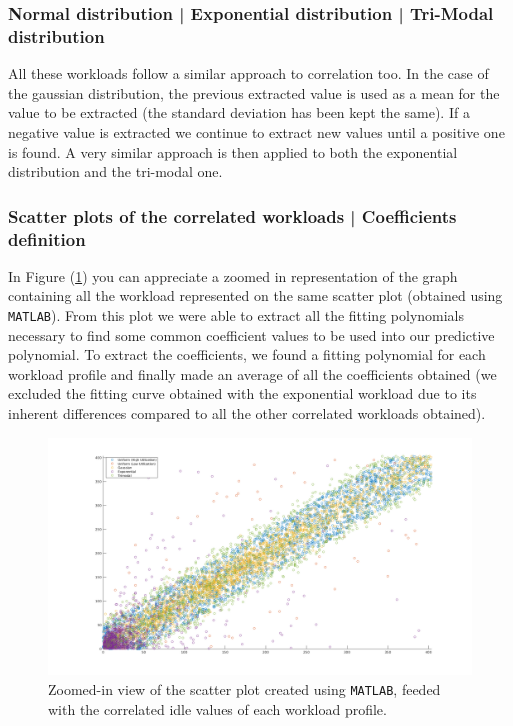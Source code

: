 \documentclass[a4paper]{article}
\begin{document}
        \subsubsection{Normal distribution | Exponential distribution | Tri-Modal distribution}
            All these workloads follow a similar approach to correlation too.
            In the case of the gaussian distribution, the previous extracted value is used as a mean for the value to be extracted (the standard deviation has been kept the same). If a negative value is extracted we continue to extract new values until a positive one is found.
            A very similar approach is then applied to both the exponential distribution and the tri-modal one.

        \subsubsection{Scatter plots of the correlated workloads | Coefficients definition}
            In Figure (\ref{fig:Scatter1}) you can appreciate a zoomed in representation of the graph containing all the workload represented on the same scatter plot (obtained using \texttt{MATLAB}). From this plot we were able to extract all the fitting polynomials necessary to find some common coefficient values to be used into our predictive polynomial.
            To extract the coefficients, we found a fitting polynomial for each workload profile and finally made an average of all the coefficients obtained  (we excluded the fitting curve obtained with the exponential workload due to its inherent differences compared to all the other correlated workloads obtained).

            \begin{figure}[htp]
                \centering
                \includegraphics[width=1 \columnwidth]{./screenshots/Scatter1.png}
                \caption{
                        \label{fig:Scatter1}
                        Zoomed-in view of the scatter plot created using \texttt{MATLAB}, feeded with the correlated idle values of each workload profile.
                }
            \end{figure}
\end{document}
